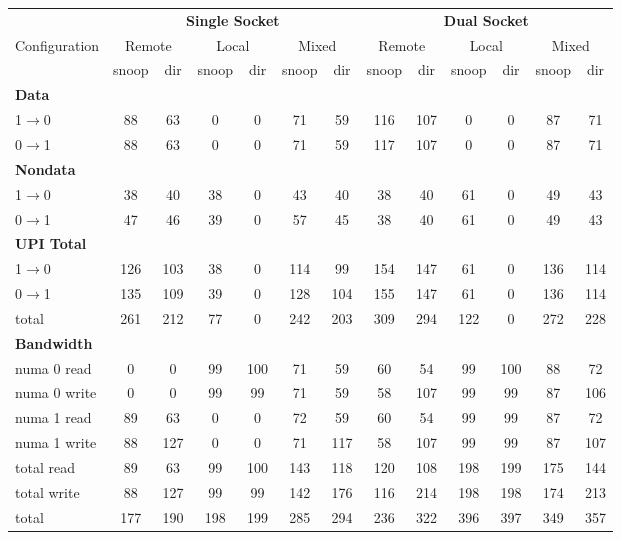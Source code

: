 \begin{table}[t] \centering \small \setlength{\tabcolsep}{5pt}
\renewcommand{\arraystretch}{1.2}

\begin{tabular}{|l|cc|cc|cc||cc|cc|cc|}
\hline

& \multicolumn{6}{c||}{\textbf{Single Socket}}
& \multicolumn{6}{c|}{\textbf{Dual Socket}} \\
\cline{2-13}

Configuration &
\multicolumn{2}{c|}{Remote} &
\multicolumn{2}{c|}{Local} &
\multicolumn{2}{c||}{Mixed} &
\multicolumn{2}{c|}{Remote} &
\multicolumn{2}{c|}{Local} &
\multicolumn{2}{c|}{Mixed} \\
\hline

& snoop & dir
& snoop & dir
& snoop & dir
& snoop & dir
& snoop & dir
& snoop & dir \\
\hline\hline

\multicolumn{13}{|l|}{\textbf{Data}} \\
\hline
1$\rightarrow$0 & 88 & 63 & 0 & 0 & 71 & 59 & 116 & 107 & 0 & 0 & 87 & 71 \\
\hline
0$\rightarrow$1 & 88 & 63 & 0 & 0 & 71 & 59 & 117 & 107 & 0 & 0 & 87 & 71 \\
\hline

\multicolumn{13}{|l|}{\textbf{Nondata}} \\
\hline
1$\rightarrow$0 & 38 & 40 & 38 & 0 & 43 & 40 & 38 & 40 & 61 & 0 & 49 & 43 \\
\hline
0$\rightarrow$1 & 47 & 46 & 39 & 0 & 57 & 45 & 38 & 40 & 61 & 0 & 49 & 43 \\
\hline

\multicolumn{13}{|l|}{\textbf{UPI Total}} \\
\hline
1$\rightarrow$0 & 126 & 103 & 38 & 0 & 114 & 99 & 154 & 147 & 61 & 0 & 136 & 114 \\
\hline
0$\rightarrow$1 & 135 & 109 & 39 & 0 & 128 & 104 & 155 & 147 & 61 & 0 & 136 & 114 \\
\hline
total           & 261 & 212 & 77 & 0 & 242 & 203 & 309 & 294 & 122 & 0 & 272 & 228 \\
\hline

\multicolumn{13}{|l|}{\textbf{Bandwidth}} \\
\hline
numa 0 read     & 0 & 0 & 99 & 100 & 71 & 59 & 60 & 54 & 99 & 100 & 88 & 72 \\
\hline
numa 0 write    & 0 & 0 & 99 & 99 & 71 & 59 & 58 & 107 & 99 & 99 & 87 & 106 \\
\hline
numa 1 read     & 89 & 63 & 0 & 0 & 72 & 59 & 60 & 54 & 99 & 99 & 87 & 72 \\
\hline
numa 1 write    & 88 & 127 & 0 & 0 & 71 & 117 & 58 & 107 & 99 & 99 & 87 & 107 \\
\hline
total read      & 89 & 63 & 99 & 100 & 143 & 118 & 120 & 108 & 198 & 199 & 175 & 144 \\
\hline
total write     & 88 & 127 & 99 & 99 & 142 & 176 & 116 & 214 & 198 & 198 & 174 & 213 \\
\hline
total           & 177 & 190 & 198 & 199 & 285 & 294 & 236 & 322 & 396 & 397 & 349 & 357 \\
\hline


\end{tabular}
\end{table}
